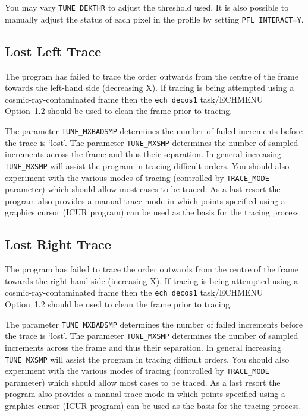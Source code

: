 \documentclass[11pt,twoside]{article}
\newcommand{\htmlref}[2]{#1}
\newcommand{\xref}[3]{#1}
\newcommand{\xlabel}[1]{}
\newcommand{\mlabel}[1]{\xlabel{#1}\label{#1}}
\newcommand{\myindex}[1]{\index{#1}}
\renewcommand{\myindex}[1]{}
\begin{document}
You may vary \texttt{TUNE\_DEKTHR} to adjust the threshold used.
It is also possible to manually adjust the status of each pixel in the
profile by setting \texttt{PFL\_INTERACT=Y}\@.


\subsection{\mlabel{lost_left_trace} Lost Left Trace}
\myindex{Tracing order paths!failure}
\myindex{Order!tracing failure}

The program has failed to trace the order outwards from the centre of
the frame towards the left-hand side (decreasing X). If tracing is being
attempted using a cosmic-ray-contaminated frame then the
\htmlref{{\tt ech\_decos1} task/ECHMENU Option~1.2}{ech_decos1}
should be used to clean the frame prior to tracing.

The parameter \texttt{TUNE\_MXBADSMP} determines the number of failed
increments before the trace is `lost'.  The parameter \texttt{TUNE\_MXSMP}
determines the number of sampled increments across the frame and thus
their separation. In general increasing \texttt{TUNE\_MXSMP} will assist the
program in tracing difficult orders.  You should also experiment
with the various modes of tracing (controlled by \texttt{TRACE\_MODE} parameter)
which should allow most cases to be traced. As a last resort the program
also provides a manual trace mode in which points specified using a
graphics cursor (\xref{ICUR}{sun86}{ICUR} program) can be used as the basis
for the tracing process.


\subsection{\mlabel{lost_right_trace} Lost Right Trace}

The program has failed to trace the order outwards from the centre of
the frame towards the right-hand side (increasing X). If tracing is
being attempted using a cosmic-ray-contaminated frame then the
\htmlref{{\tt ech\_decos1} task/ECHMENU Option~1.2}{ech_decos1}
should be used to clean the frame prior to tracing.

The parameter \texttt{TUNE\_MXBADSMP} determines the number of failed
increments before the trace is `lost'. The parameter \texttt{TUNE\_MXSMP}
determines the number of sampled increments across the frame and thus
their separation. In general increasing \texttt{TUNE\_MXSMP} will assist the
program in tracing difficult orders.  You should also experiment
with the various modes of tracing (controlled by \texttt{TRACE\_MODE} parameter)
which should allow most cases to be traced. As a last resort the program
also provides a manual trace mode in which points specified using a
graphics cursor (\xref{ICUR}{sun86}{ICUR} program) can be used as the basis
for the tracing process.
\end{document}
